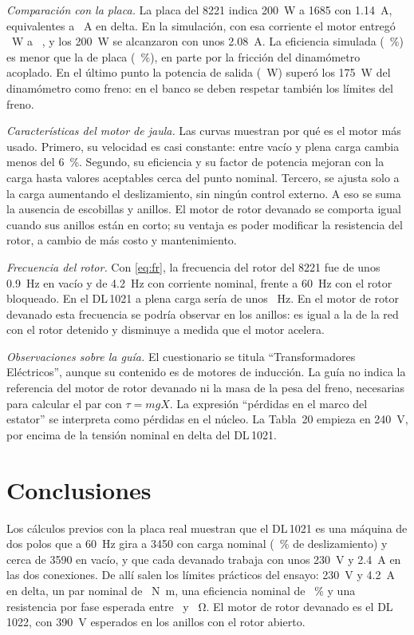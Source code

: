 \documentclass[conference]{IEEEtran}
\begin{document}
\emph{Comparación con la placa.} La placa del 8221 indica \SI{200}{W} a \SI{1685}{\rpm} con \SI{1,14}{A}, equivalentes a \LVIfD~\si{A} en delta. En la simulación, con esa corriente el motor entregó \CnomPout~\si{W} a \Cnomn~\si{\rpm}, y los \SI{200}{W} se alcanzaron con unos \SI{2,08}{A}. La eficiencia simulada (\Cnometa~\%) es menor que la de placa (\LVeta~\%), en parte por la fricción del dinamómetro acoplado. En el último punto la potencia de salida (\CultPout~\si{W}) superó los \SI{175}{W} del dinamómetro como freno: en el banco se deben respetar también los límites del freno.

\emph{Características del motor de jaula.} Las curvas muestran por qué es el motor más usado. Primero, su velocidad es casi constante: entre vacío y plena carga cambia menos del \SI{6}{\percent}. Segundo, su eficiencia y su factor de potencia mejoran con la carga hasta valores aceptables cerca del punto nominal. Tercero, se ajusta solo a la carga aumentando el deslizamiento, sin ningún control externo. A eso se suma la ausencia de escobillas y anillos. El motor de rotor devanado se comporta igual cuando sus anillos están en corto; su ventaja es poder modificar la resistencia del rotor, a cambio de más costo y mantenimiento.

\emph{Frecuencia del rotor.} Con \eqref{eq:fr}, la frecuencia del rotor del 8221 fue de unos \SI{0,9}{Hz} en vacío y de \SI{4,2}{Hz} con corriente nominal, frente a \SI{60}{Hz} con el rotor bloqueado. En el DL\,1021 a plena carga sería de unos \DLfrSes~\si{Hz}. En el motor de rotor devanado esta frecuencia se podría observar en los anillos: es igual a la de la red con el rotor detenido y disminuye a medida que el motor acelera.

\emph{Observaciones sobre la guía.} El cuestionario se titula ``Transformadores Eléctricos'', aunque su contenido es de motores de inducción. La guía no indica la referencia del motor de rotor devanado ni la masa de la pesa del freno, necesarias para calcular el par con $\tau=mgX$. La expresión ``pérdidas en el marco del estator'' se interpreta como pérdidas en el núcleo. La Tabla~20 empieza en \SI{240}{V}, por encima de la tensión nominal en delta del DL\,1021.

\FloatBarrier
\section{Conclusiones}
Los cálculos previos con la placa real muestran que el DL\,1021 es una máquina de dos polos que a \SI{60}{Hz} gira a \SI{3450}{\rpm} con carga nominal (\DLsSes~\% de deslizamiento) y cerca de \SI{3590}{\rpm} en vacío, y que cada devanado trabaja con unos \SI{230}{V} y \SI{2,4}{A} en las dos conexiones. De allí salen los límites prácticos del ensayo: \SI{230}{V} y \SI{4,2}{A} en delta, un par nominal de \DLTsesenta~\si{N.m}, una eficiencia nominal de \DLetaSes~\% y una resistencia por fase esperada entre \DLRLo\ y \DLRHi~\si{\ohm}. El motor de rotor devanado es el DL\,1022, con \SI{390}{V} esperados en los anillos con el rotor abierto.
\end{document}
